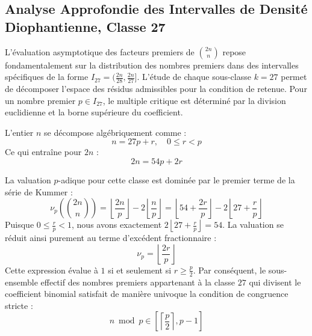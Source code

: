 \documentclass[12pt,a4paper]{article}
\begin{document}
    \newpage
    \subsection{Analyse Approfondie des Intervalles de Densité Diophantienne, Classe 27}
    L'évaluation asymptotique des facteurs premiers de $\binom{2n}{n}$ repose fondamentalement sur la distribution des nombres premiers dans des intervalles spécifiques de la forme $I_27 = (\frac{2n}{28}, \frac{2n}{27}]$.
    L'étude de chaque sous-classe $k = 27$ permet de décomposer l'espace des résidus admissibles pour la condition de retenue.
    Pour un nombre premier $p \in I_27$, le multiple critique est déterminé par la division euclidienne et la borne supérieure du coefficient.

    L'entier $n$ se décompose algébriquement comme :
    \begin{equation}
    n = 27 p + r, \quad 0 \le r < p
    \end{equation}
    Ce qui entraîne pour $2n$ :
    \begin{equation}
    2n = 54 p + 2r
    \end{equation}

    La valuation $p$-adique pour cette classe est dominée par le premier terme de la série de Kummer :
    \begin{equation}
    \nu_p\left( \binom{2n}{n} \right) = \left\lfloor \frac{2n}{p} \right\rfloor - 2 \left\lfloor \frac{n}{p} \right\rfloor = \left\lfloor 54 + \frac{2r}{p} \right\rfloor - 2 \left\lfloor 27 + \frac{r}{p} \right\rfloor
    \end{equation}
    Puisque $0 \le \frac{r}{p} < 1$, nous avons exactement $2 \left\lfloor 27 + \frac{r}{p} \right\rfloor = 54$.
    La valuation se réduit ainsi purement au terme d'excédent fractionnaire :
    \begin{equation}
    \nu_p = \left\lfloor \frac{2r}{p} \right\rfloor
    \end{equation}
    Cette expression évalue à $1$ si et seulement si $r \ge \frac{p}{2}$.
    Par conséquent, le sous-ensemble effectif des nombres premiers appartenant à la classe $27$ qui divisent le coefficient binomial satisfait de manière univoque la condition de congruence stricte :
    \begin{equation}
    n \bmod p \in \left[ \left\lceil \frac{p}{2} \right\rceil, p - 1 \right]
    \end{equation}
\end{document}
